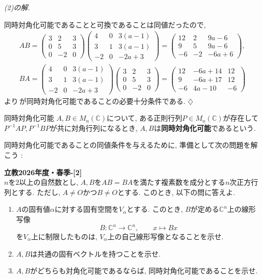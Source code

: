 \documentclass[titlepage]{jsarticle}
\numberwithin{equation}{section}
\newcommand{\C}{\mathbb{C}}%
\newenvironment{kaitou}[1][解]{%
\begin{proofbox}%
\textit{#1. }\ignorespaces
}{%
\hfill$\diamondsuit$%
\end{proofbox}%
}
\begin{document}
\begin{kaitou}[(2)の解]
同時対角化可能であることと可換であることは同値だったので,
\begin{align*}
AB = 
\begin{pmatrix}
3 & 2 & 3\\
0 & 5 & 3\\
0 & -2 & 0
\end{pmatrix}
\begin{pmatrix}
4 & 0 & 3(a-1)\\
3 & 1 & 3(a-1)\\
-2 & 0 & -2a + 3
\end{pmatrix}
=
\begin{pmatrix}
12 & 2 & 9a - 6\\
9 & 5 & 9a - 6\\
-6 & -2 & -6a + 6
\end{pmatrix},
\\
BA =
\begin{pmatrix}
4 & 0 & 3(a-1)\\
3 & 1 & 3(a-1)\\
-2 & 0 & -2a + 3
\end{pmatrix}
\begin{pmatrix}
3 & 2 & 3\\
0 & 5 & 3\\
0 & -2 & 0
\end{pmatrix}
=
\begin{pmatrix}
12 & -6a+14 & 12\\
9 & -6a + 17 & 12\\
-6 & 4a - 10 & -6
\end{pmatrix}
\end{align*}
より\,が同時対角化可能であることの必要十分条件である.
\end{kaitou}
\begin{dfn}{同時対角化可能}{}
$A, B \in M_n(\C)$について, ある正則行列$P \in M_n(\C)$が存在して$P^{-1}AP, P^{-1}BP$が共に対角行列になるとき, $A, B$は\textbf{同時対角化可能}であるという.
\end{dfn}
同時対角化可能であることの同値条件を与えるために, 準備として次の問題を解こう : 
\begin{problem}
\textbf{立教2026年度・春季-[2]}\\
$n$を$2$以上の自然数とし, $A, B$を$AB=BA$を満たす複素数を成分とする$n$次正方行列とする. ただし, $A\neq O$かつ$B\neq O$とする. このとき, 以下の問に答えよ.

\begin{enumerate}[label=(\roman*)]
\item
$A$の固有値$\alpha$に対する固有空間を$V_\alpha$とする.
このとき, $B$が定める$\mathbb{C}^n$上の線形写像
\[
B\colon \mathbb{C}^n\longrightarrow \mathbb{C}^n,
\qquad
x\longmapsto Bx
\]
を$V_\alpha$上に制限したものは, $V_\alpha$上の自己線形写像となることを示せ.

\item
$A, B$は共通の固有ベクトルを持つことを示せ.
\item
$A, B$がどちらも対角化可能であるならば, 同時対角化可能であることを示せ.
\end{enumerate}
\end{problem}
\end{document}
